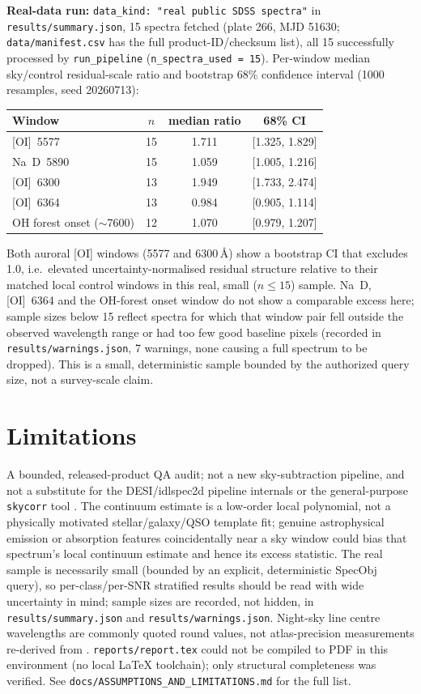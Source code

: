 \documentclass[11pt]{article}
\begin{document}
\textbf{Real-data run:} \texttt{data\_kind: "real public SDSS spectra"} in
\texttt{results/summary.json}, 15 spectra fetched (plate 266, MJD 51630;
\texttt{data/manifest.csv} has the full product-ID/checksum list), all 15
successfully processed by \texttt{run\_pipeline} (\texttt{n\_spectra\_used =
15}). Per-window median sky/control residual-scale ratio and bootstrap 68\%
confidence interval (1000 resamples, seed 20260713):
\begin{center}
\begin{tabular}{lccc}
\toprule
Window & $n$ & median ratio & 68\% CI \\
\midrule
{[OI]}~5577 & 15 & 1.711 & [1.325, 1.829] \\
Na~D~5890 & 15 & 1.059 & [1.005, 1.216] \\
{[OI]}~6300 & 13 & 1.949 & [1.733, 2.474] \\
{[OI]}~6364 & 13 & 0.984 & [0.905, 1.114] \\
OH forest onset ($\sim$7600) & 12 & 1.070 & [0.979, 1.207] \\
\bottomrule
\end{tabular}
\end{center}
Both auroral [OI] windows (5577 and 6300\,\AA) show a bootstrap CI that
excludes 1.0, i.e.\ elevated uncertainty-normalised residual structure
relative to their matched local control windows in this real, small
($n\le15$) sample. Na~D, [OI]~6364 and the OH-forest onset window do not
show a comparable excess here; sample sizes below 15 reflect spectra for
which that window pair fell outside the observed wavelength range or had
too few good baseline pixels (recorded in \texttt{results/warnings.json},
7 warnings, none causing a full spectrum to be dropped). This is a small,
deterministic sample bounded by the authorized query size, not a
survey-scale claim.

\section{Limitations}
\label{sec:limitations}
A bounded, released-product QA audit; not a new sky-subtraction pipeline,
and not a substitute for the DESI/idlspec2d pipeline internals
\citep{Guy2023DESIPipeline} or the general-purpose \texttt{skycorr} tool
\citep{Noll2014Skycorr}. The continuum estimate is a low-order local
polynomial, not a physically motivated stellar/galaxy/QSO template fit;
genuine astrophysical emission or absorption features coincidentally near a
sky window could bias that spectrum's local continuum estimate and hence
its excess statistic. The real sample is necessarily small (bounded by an
explicit, deterministic SpecObj query), so per-class/per-SNR stratified
results should be read with wide uncertainty in mind; sample sizes are
recorded, not hidden, in \texttt{results/summary.json} and
\texttt{results/warnings.json}. Night-sky line centre wavelengths are
commonly quoted round values, not atlas-precision measurements re-derived
from \citet{Hanuschik2003SkyAtlas}. \texttt{reports/report.tex} could not be
compiled to PDF in this environment (no local LaTeX toolchain); only
structural completeness was verified. See
\texttt{docs/ASSUMPTIONS\_AND\_LIMITATIONS.md} for the full list.
\end{document}
